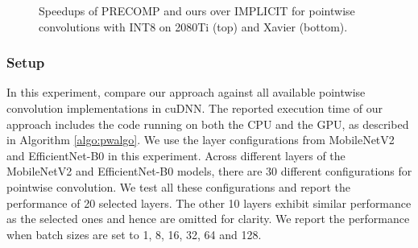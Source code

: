 \begin{figure}
\captionsetup[subfloat]{labelformat=empty,skip=0pt}

	\centering
	\vspace{-5mm}
	\vspace{-6mm}
	\caption{Speedups of PRECOMP and ours over IMPLICIT for pointwise convolutions with INT8 on 2080Ti (top) and Xavier (bottom).}
	\label{fig:pwspeedupint8}
\end{figure}


\subsubsection{Setup} In this experiment,  compare our approach against all available pointwise convolution implementations in cuDNN.
The reported execution time of our approach includes the code running on both the CPU and the GPU, as described in Algorithm
\ref{algo:pwalgo}. We use the layer configurations from MobileNetV2 and EfficientNet-B0 in this experiment. Across different layers of the MobileNetV2 and EfficientNet-B0
models, there are 30 different configurations for pointwise convolution. We test all these configurations and report the performance of 20
selected layers. The other 10 layers exhibit similar performance as the selected ones and hence are omitted for clarity. We report the
performance when batch sizes are set to 1, 8, 16, 32, 64 and 128.

